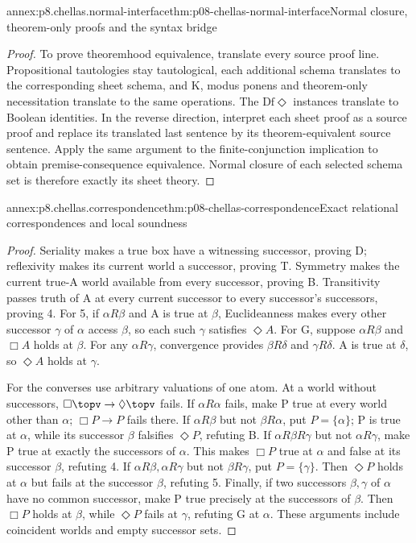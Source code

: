 \begin{annexitem}{annex:p8.chellas.normal-interface}{thm:p08-chellas-normal-interface}{Normal closure, theorem-only proofs and the syntax bridge}
\begin{proof}
To prove theoremhood equivalence, translate every source proof line.
Propositional tautologies stay tautological, each additional schema
translates to the corresponding sheet schema, and K, modus ponens and
theorem-only necessitation translate to the same operations. The
\(\mathrm{Df}\Diamond\) instances translate to Boolean identities.
In the reverse direction, interpret each sheet proof as a source proof
and replace its translated last sentence by its theorem-equivalent
source sentence. Apply the same argument to the finite-conjunction
implication to obtain premise-consequence equivalence. Normal closure
of each selected schema set is therefore exactly its sheet theory.
\end{proof}
\end{annexitem}

\begin{annexitem}{annex:p8.chellas.correspondence}{thm:p08-chellas-correspondence}{Exact relational correspondences and local soundness}
\begin{proof}
Seriality makes a true box have a witnessing successor, proving D;
reflexivity makes its current world a successor, proving T. Symmetry
makes the current true-A world available from every successor, proving
B. Transitivity passes truth of A at every current successor to every
successor's successors, proving 4. For 5, if \(\alpha R\beta\)
and A is true at \(\beta\), Euclideanness makes every other successor
\(\gamma\) of \(\alpha\) access \(\beta\), so each such
\(\gamma\) satisfies \(\Diamond A\). For G, suppose
\(\alpha R\beta\) and \(\Box A\) holds at \(\beta\).
For any \(\alpha R\gamma\), convergence provides
\(\beta R\delta\) and \(\gamma R\delta\).
A is true at \(\delta\), so \(\Diamond A\) holds at \(\gamma\).

For the converses use arbitrary valuations of one atom. At a world
without successors, \(\Box\topv\to\Diamond\topv\) fails.
If \(\alpha R\alpha\) fails, make P true at every world other
than \(\alpha\); \(\Box P\to P\) fails there.
If \(\alpha R\beta\) but not \(\beta R\alpha\), put
\(P=\{\alpha\}\); P is true at \(\alpha\), while its successor
\(\beta\) falsifies \(\Diamond P\), refuting B.
If \(\alpha R\beta R\gamma\) but not \(\alpha R\gamma\),
make P true at exactly the successors of \(\alpha\). This makes
\(\Box P\) true at \(\alpha\) and false at its successor
\(\beta\), refuting 4. If \(\alpha R\beta,\alpha R\gamma\)
but not \(\beta R\gamma\), put \(P=\{\gamma\}\).
Then \(\Diamond P\) holds at \(\alpha\) but fails at the
successor \(\beta\), refuting 5. Finally, if two successors
\(\beta,\gamma\) of \(\alpha\) have no common successor,
make P true precisely at the successors of \(\beta\).
Then \(\Box P\) holds at \(\beta\), while \(\Diamond P\)
fails at \(\gamma\), refuting G at \(\alpha\).
These arguments include coincident worlds and empty successor sets.


\end{proof}
\end{annexitem}
